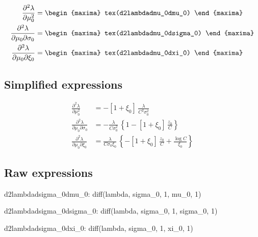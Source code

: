 {\color{MonVertF}
\begin{align*}
  \frac{\partial^2{\lambda}}{\partial \mu_0^2}
  &=
\begin{maxima}
  tex(d2lambdadmu_0dmu_0)
\end{maxima}\\
 \frac{\partial^2{\lambda}}{\partial \mu_0 \partial \sigma_0}
  &=
\begin{maxima}
  tex(d2lambdadmu_0dsigma_0)
\end{maxima}\\
\frac{\partial^2{\lambda}}{\partial \mu_0 \partial \xi_0}
  &=
\begin{maxima}
  tex(d2lambdadmu_0dxi_0)
\end{maxima}
\end{align*}
}

\subsection*{Simplified expressions}

{\color{red}
\begin{align*}
  \frac{\partial^2{\lambda}}{\partial \mu_0^2}
  &= -\left[1 + \xi_0\right] \, \frac{\lambda}{C^2 \sigma_0^2}\\
 \frac{\partial^2{\lambda}}{\partial \mu_0 \partial \sigma_0}
  &=  - \frac{\lambda}{C \sigma_0^2} \,
    \left\{ 1 - \left[1 + \xi_0\right] \, \frac{z_0}{C}
   \right\}\\
\frac{\partial^2{\lambda}}{\partial \mu_0 \partial \xi_0}
  &= \frac{\lambda}{C \sigma_0 \xi_0}\, \left\{ -\left[1 + \xi_0\right] \,
    \frac{z_0}{C} + \frac{\log C}{\xi_0} 
    \right\}
\end{align*}
}


\subsection*{Raw expressions}

\begin{maxima}
  d2lambdadsigma_0dmu_0: diff(lambda, sigma_0, 1, mu_0, 1)
\end{maxima}
\begin{maxima}
  d2lambdadsigma_0dsigma_0: diff(lambda, sigma_0, 1, sigma_0, 1)
\end{maxima}
\begin{maxima}
  d2lambdadsigma_0dxi_0: diff(lambda, sigma_0, 1, xi_0, 1)
\end{maxima}

